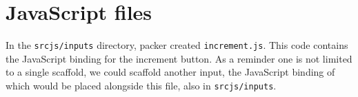 \documentclass[
]{krantz}
\makeatletter
\newenvironment{Shaded}{\begin{snugshade}}{\end{snugshade}}
\newcommand{\CommentTok}[1]{\textcolor[rgb]{0.37,0.37,0.37}{\textit{#1}}}
\newenvironment{kframe}{%
\medskip{}
\setlength{\fboxsep}{.8em}
 \def\at@end@of@kframe{}%
 \ifinner\ifhmode%
  \def\at@end@of@kframe{\end{minipage}}%
  \begin{minipage}{\columnwidth}%
 \fi\fi%
 \def\FrameCommand##1{\hskip\@totalleftmargin \hskip-\fboxsep
 \colorbox{shadecolor}{##1}\hskip-\fboxsep
     \hskip-\linewidth \hskip-\@totalleftmargin \hskip\columnwidth}%
 \MakeFramed {\advance\hsize-\width
   \@totalleftmargin\z@ \linewidth\hsize
   \@setminipage}}%
 {\par\unskip\endMakeFramed%
 \at@end@of@kframe}
\renewenvironment{Shaded}{\begin{kframe}}{\end{kframe}}
\makeatother
\begin{document}
\begin{Shaded}
\end{Shaded}

\hypertarget{packer-js-files}{%
\section{JavaScript files}\label{packer-js-files}}

In the \texttt{srcjs/inputs} directory, packer created \texttt{increment.js}. This code contains the JavaScript binding for the increment button. As a reminder one is not limited to a single scaffold, we could scaffold another input, the JavaScript binding of which would be placed alongside this file, also in \texttt{srcjs/inputs}.
\end{document}
